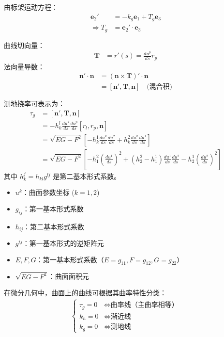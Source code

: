\documentclass[lang=cn,10pt,thmcnt=section]{elegantbook}
\begin{document}
由标架运动方程：
\begin{align*}
\mathbf{e}_2' &= -k_g \mathbf{e}_1 + T_g \mathbf{e}_3 \\
\Rightarrow T_g &= \mathbf{e}_2' \cdot \mathbf{e}_3
\end{align*}



曲线切向量：
\begin{align*}
\mathbf{T} &= r'(s) = \frac{d u^p}{d s} r_p
\end{align*}
法向量导数：
\begin{align*}
\mathbf{n}' \cdot \mathbf{n} &= (\mathbf{n} \times \mathbf{T})' \cdot \mathbf{n} \\
&= [\mathbf{n}', \mathbf{T}, \mathbf{n}] \quad \text{(混合积)}
\end{align*}


测地挠率可表示为：
\begin{align*}
 \tau_g&= [\mathbf{n}', \mathbf{T}, \mathbf{n}] \\
&= -h_k^l \frac{du^k}{ds} \frac{du^p}{ds} [r_l, r_p, \mathbf{n}] \\
&= \sqrt{EG-F^2} \left[ -h_k^1 \frac{du^k}{ds} \frac{du^2}{ds} + h_k^2 \frac{du^k}{ds} \frac{du^1}{ds} \right]\\
&= \sqrt{EG-F^2} \left[ -h_1^2 \left( \frac{du^1}{ds} \right)^2 + (h_2^2 - h_1^1) \frac{du^1}{ds} \frac{du^2}{ds} - h_2^1 \left( \frac{du^2}{ds} \right)^2 \right]
\end{align*}
其中 $h_k^j = h_{kl} g^{lj}$ 是第二基本形式系数。


\begin{itemize}
\item $u^k$：曲面参数坐标 ($k=1,2$)
\item $g_{ij}$：第一基本形式系数
\item $h_{ij}$：第二基本形式系数
\item $g^{ij}$：第一基本形式的逆矩阵元
\item $E, F, G$：第一基本形式系数（$E = g_{11}, F = g_{12}, G = g_{22}$）
\item $\sqrt{EG-F^2}$：曲面面积元
\end{itemize}




在微分几何中，曲面上的曲线可根据其曲率特性分类：
\begin{align*}
\begin{cases}
\tau_g = 0 & \iff \text{曲率线（主曲率相等）} \\
k_n = 0 & \iff \text{渐近线} \\
k_g = 0 & \iff \text{测地线}
\end{cases}
\end{align*}
\end{document}

